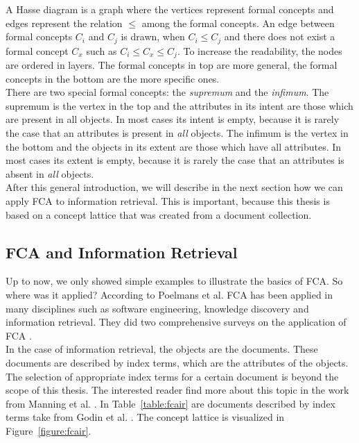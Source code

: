 \documentclass[11pt]{report}
\begin{document}
A Hasse diagram is a graph where the vertices represent formal concepts and edges represent the relation $\le$ among the formal concepts. An edge between formal concepts $C_i$ and $C_j$ is drawn, when $C_i \le C_j$ and there does not exist a formal concept $C_x$ such as $C_i \le C_x \le C_j$. To increase the readability, the nodes are ordered in layers. The formal concepts in top are more general, the formal concepts in the bottom are the more specific ones.\\

There are two special formal concepts: the \textit{supremum} and the \textit{infimum}. The supremum is the vertex in the top and the attributes in its intent are those which are present in all objects. In most cases its intent is empty, because it is rarely the case that an attributes is present in \textit{all} objects. The infimum is the vertex in the bottom and the objects in its extent are those which have all attributes. In most cases its extent is empty, because it is rarely the case that an attributes is absent in \textit{all} objects.\\

After this general introduction, we will describe in the next section how we can apply FCA to information retrieval. This is important, because this thesis is based on a concept lattice that was created from a document collection.

\subsection{FCA and Information Retrieval}
\label{section:fcair}

Up to now, we only showed simple examples to illustrate the basics of FCA. So where was it applied? According to Poelmans et al. \cite{Poelmans2013} FCA has been applied in many disciplines such as software engineering, knowledge discovery and information retrieval. They did two comprehensive surveys on the application of FCA \cite{Poelmans2013, Poelmans2013b}.\\

In the case of information retrieval, the objects are the documents. These documents are described by index terms, which are the attributes of the objects. The selection of appropriate index terms for a certain document is beyond the scope of this thesis. The interested reader find more about this topic in the work from Manning et al. \cite{manning2008introduction}. In Table~\ref{table:fcair} are documents described by index terms take from Godin et al. \cite{Godin1993}. The concept lattice is visualized in Figure~\ref{figure:fcair}.
\end{document}
